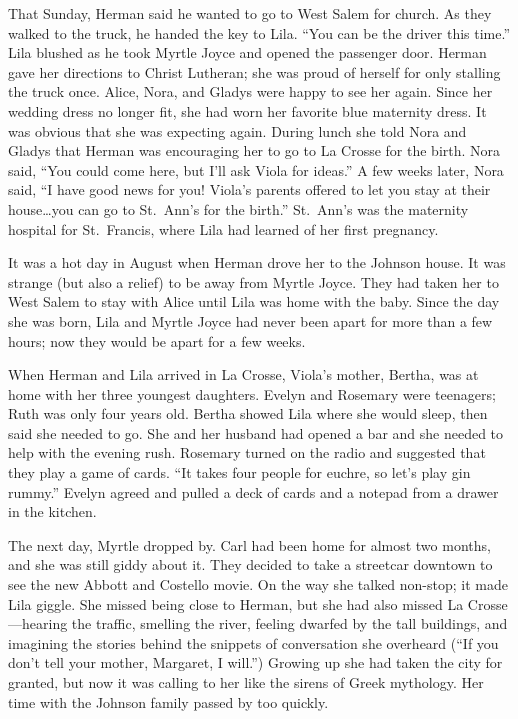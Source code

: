 \documentclass[
  letterpaper,
]{book}
\begin{document}
That Sunday, Herman said he wanted to go to West Salem for church. As
they walked to the truck, he handed the key to Lila. ``You can be the
driver this time.'' Lila blushed as he took Myrtle Joyce and opened the
passenger door. Herman gave her directions to Christ Lutheran; she was
proud of herself for only stalling the truck once. Alice, Nora, and
Gladys were happy to see her again. Since her wedding dress no longer
fit, she had worn her favorite blue maternity dress. It was obvious that
she was expecting again. During lunch she told Nora and Gladys that
Herman was encouraging her to go to La Crosse for the birth. Nora said,
``You could come here, but I'll ask Viola for ideas.'' A few weeks
later, Nora said, ``I have good news for you! Viola's parents offered to
let you stay at their house\ldots you can go to St.~Ann's for the
birth.'' St.~Ann's was the maternity hospital for St.~Francis, where
Lila had learned of her first pregnancy.

It was a hot day in August when Herman drove her to the Johnson house.
It was strange (but also a relief) to be away from Myrtle Joyce. They
had taken her to West Salem to stay with Alice until Lila was home with
the baby. Since the day she was born, Lila and Myrtle Joyce had never
been apart for more than a few hours; now they would be apart for a few
weeks.

When Herman and Lila arrived in La Crosse, Viola's mother, Bertha, was
at home with her three youngest daughters. Evelyn and Rosemary were
teenagers; Ruth was only four years old. Bertha showed Lila where she
would sleep, then said she needed to go. She and her husband had opened
a bar and she needed to help with the evening rush. Rosemary turned on
the radio and suggested that they play a game of cards. ``It takes four
people for euchre, so let's play gin rummy.'' Evelyn agreed and pulled a
deck of cards and a notepad from a drawer in the kitchen.

The next day, Myrtle dropped by. Carl had been home for almost two
months, and she was still giddy about it. They decided to take a
streetcar downtown to see the new Abbott and Costello movie. On the way
she talked non-stop; it made Lila giggle. She missed being close to
Herman, but she had also missed La Crosse---hearing the traffic,
smelling the river, feeling dwarfed by the tall buildings, and imagining
the stories behind the snippets of conversation she overheard (``If you
don't tell your mother, Margaret, I will.'') Growing up she had taken
the city for granted, but now it was calling to her like the sirens of
Greek mythology. Her time with the Johnson family passed by too quickly.
\end{document}
